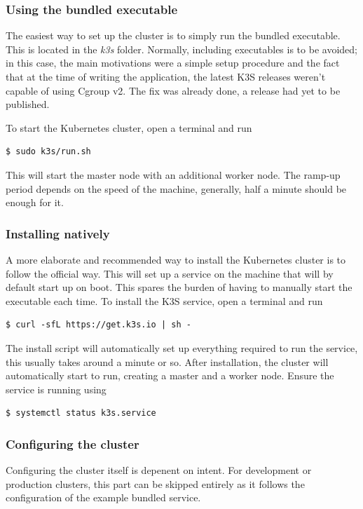 \subsubsection{Using the bundled executable}
The easiest way to set up the cluster is to simply run the bundled executable. This is located in the  \textit{k3s} folder. Normally, including executables is to be avoided; in this case, the main motivations were a simple setup procedure and the fact that at the time of writing the application, the latest K3S releases weren't capable of using Cgroup v2. The fix was already done, a release had yet to be published.

\noindent
To start the Kubernetes cluster, open a terminal and run
\begin{verbatim}
$ sudo k3s/run.sh
\end{verbatim}

\noindent
This will start the master node with an additional worker node. The ramp-up period depends on the speed of the machine, generally, half a minute should be enough for it.

\subsubsection{Installing natively}
A more elaborate and recommended way to install the Kubernetes cluster is to follow the official way. This will set up a service on the machine that will by default start up on boot. This spares the burden of having to manually start the executable each time. To install the K3S service, open a terminal and run
\begin{verbatim}
$ curl -sfL https://get.k3s.io | sh -
\end{verbatim}

\noindent
The install script will automatically set up everything required to run the service, this usually takes around a minute or so. After installation, the cluster will automatically start to run, creating a master and a worker node. Ensure the service is running using
\begin{verbatim}
$ systemctl status k3s.service
\end{verbatim}

\subsubsection{Configuring the cluster}
Configuring the cluster itself is depenent on intent. For development or production clusters, this part can be skipped entirely as it follows the configuration of the example bundled service. \\

